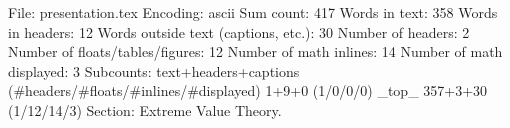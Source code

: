 File: presentation.tex
Encoding: ascii
Sum count: 417
Words in text: 358
Words in headers: 12
Words outside text (captions, etc.): 30
Number of headers: 2
Number of floats/tables/figures: 12
Number of math inlines: 14
Number of math displayed: 3
Subcounts:
  text+headers+captions (#headers/#floats/#inlines/#displayed)
  1+9+0 (1/0/0/0) _top_
  357+3+30 (1/12/14/3) Section: Extreme Value Theory. 

